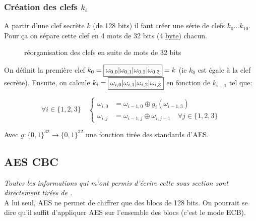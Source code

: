 \documentclass[a4paper, 12pt]{article}
\begin{document}
\subsubsection{Création des clefs $k_i$}\label{clefki}
A partir d'une clef secrète $k$ (de 128 bits) il faut créer une série de clefs $k_0\dots k_{10}$.
Pour ça on sépare cette clef en 4 mots de 32 bits (4 \hyperref[byte]{byte}) chacun.

\begin{figure}[h]
\centering
{}
\caption{réorganisation des clefs en suite de mots de 32 bits}
\label{illu_clef}
\end{figure}
On définit la première clef $k_0 = \fbox{$\omega_{0,0}|\omega_{0,1}|\omega_{0,2}|\omega_{0,3}$} = k$ (ie $k_0$ est égale à la clef secrète). Ensuite, on calcule $k_i = \fbox{$\omega_{i,0}|\omega_{i,1}|\omega_{i,2}|\omega_{i,3}$}$ en fonction de $k_{i-1}$ tel que:

$$
\forall i \in \{1,2,3\} \quad 
\begin{cases}
	\omega_{i,0} &= \omega_{i-1,0} \oplus g_i(\omega_{i-1,3}) \\
	\omega_{i,j} &= \omega_{i-1,j} \oplus \omega_{i,j-1} \quad \forall j \in \{1,2,3\} 
\end{cases}
$$

\noindent Avec $g: \{0,1\}^{32} \rightarrow \{0,1\}^{32}$ une fonction tirée des standards d'AES.

\subsection{AES CBC}\label{sectioncbc}
\noindent\emph{Toutes les informations qui m'ont permis d'écrire cette sous section sont directement tirées de \cite{courscourt}.}\\

A lui seul, AES ne permet de chiffrer que des blocs de 128 bits. On pourrait se dire qu'il suffit d'appliquer AES sur l'ensemble des blocs (c'est le mode ECB). 
\end{document}
